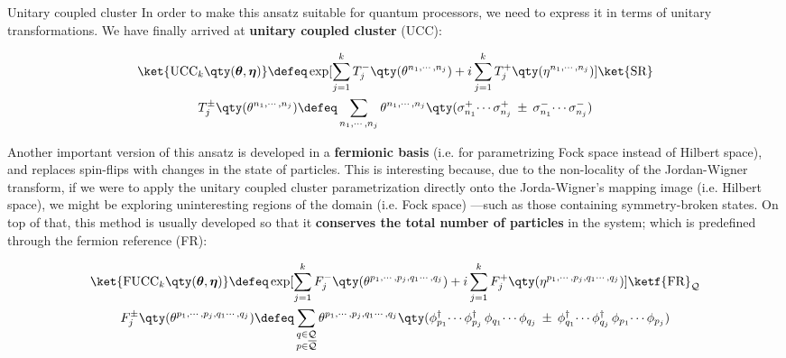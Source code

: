 \begin{frame}[allowframebreaks]{Unitary coupled cluster}
	In order to make this ansatz suitable for quantum processors, we need to express it in terms of unitary transformations. We have finally arrived at \textbf{unitary coupled cluster} (UCC):

	\begin{gather*}
	  \ket{\text{UCC}_{k} \qty(\boldsymbol{\theta},\boldsymbol{\eta})} \defeq
	    \exp[
	      \sum_{j=1}^{k} T_{j}^{-} \qty(\theta^{n_1,\cdots,n_j}) + i
	      \sum_{j=1}^{k} T_{j}^{+} \qty(\eta^{n_1,\cdots,n_j})
	    ]
	    \ket{\text{SR}} \\
	    T_{j}^{\pm} \qty(\theta^{n_1,\cdots,n_j}) \defeq
	      \sum_{n_1,\cdots,n_j} \theta^{n_1,\cdots,n_j} \qty(
	        \sigma^{+}_{n_1} \! \cdots \sigma^{+}_{n_j} \: \pm \:
	        \sigma^{-}_{n_1} \! \cdots \sigma^{-}_{n_j}
	      )
	\end{gather*}

\break

	Another important version of this ansatz is developed in a \textbf{fermionic basis} (i.e. for parametrizing Fock space instead of Hilbert space), and replaces spin-flips with changes in the state of particles. This is interesting because, due to the non-locality of the Jordan-Wigner transform, if we were to apply the unitary coupled cluster parametrization directly onto the Jorda-Wigner's mapping image (i.e. Hilbert space), we might be exploring uninteresting regions of the domain (i.e. Fock space) ---such as those containing symmetry-broken states. On top of that, this method is usually developed so that it \textbf{conserves the total number of particles} in the system; which is predefined through the fermion reference (FR):

	\begin{gather*}
	  \ket{\text{FUCC}_{k} \qty(\boldsymbol{\theta},\boldsymbol{\eta})} \defeq
	    \exp[
	      \sum_{j=1}^{k} F_{j}^{-} \qty(\theta^{p_1,\cdots,p_j,q_1\cdots,q_j}) +i
	      \sum_{j=1}^{k} F_{j}^{+} \qty(\eta^{p_1,\cdots,p_j,q_1\cdots,q_j})
	    ]
	    \ketf{\text{FR}}_{\mathcal{Q}} \\
	    F_{j}^{\pm} \qty(\theta^{p_1,\cdots,p_j,q_1\cdots,q_j}) \defeq
	      \sum_{\substack{q \in \mathcal{Q} \\ p \in \overline{\mathcal{Q}}}}
	      \theta^{p_1,\cdots,p_j,q_1\cdots,q_j} \qty(
	        \phi^{\dagger}_{p_1} \! \cdots \phi^{\dagger}_{p_j} \,
	        \phi_{q_1} \! \cdots \phi_{q_j} \: \pm \:
	        \phi^{\dagger}_{q_1} \! \cdots \phi^{\dagger}_{q_j} \,
	        \phi_{p_1} \! \cdots \phi_{p_j}
	      )
	\end{gather*}

\end{frame}
